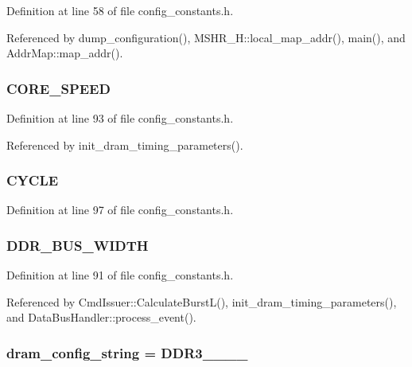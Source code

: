 Definition at line 58 of file config\_\-constants.h.

Referenced by dump\_\-configuration(), MSHR\_\-H::local\_\-map\_\-addr(), main(), and AddrMap::map\_\-addr().
\subsubsection[{CORE\_\-SPEED}]{ {\bf CORE\_\-SPEED}}\label{config__constants_8h_35d206401cbf25e649eeaaabe640bdeb}




Definition at line 93 of file config\_\-constants.h.

Referenced by init\_\-dram\_\-timing\_\-parameters().
\subsubsection[{CYCLE}]{ {\bf CYCLE}}\label{config__constants_8h_edf6b282fe503cde395d3e12e2d63ffc}




Definition at line 97 of file config\_\-constants.h.
\subsubsection[{DDR\_\-BUS\_\-WIDTH}]{ {\bf DDR\_\-BUS\_\-WIDTH}}\label{config__constants_8h_c8c3d8aa62537d9f6ced46f883d8099b}




Definition at line 91 of file config\_\-constants.h.

Referenced by CmdIssuer::CalculateBurstL(), init\_\-dram\_\-timing\_\-parameters(), and DataBusHandler::process\_\-event().
\subsubsection[{dram\_\-config\_\-string}]{ {\bf dram\_\-config\_\-string} = DDR3\_\_\_\_}\label{config__constants_8h_3b6b4be16dd8a08f4cb1f477dee6ca48}




